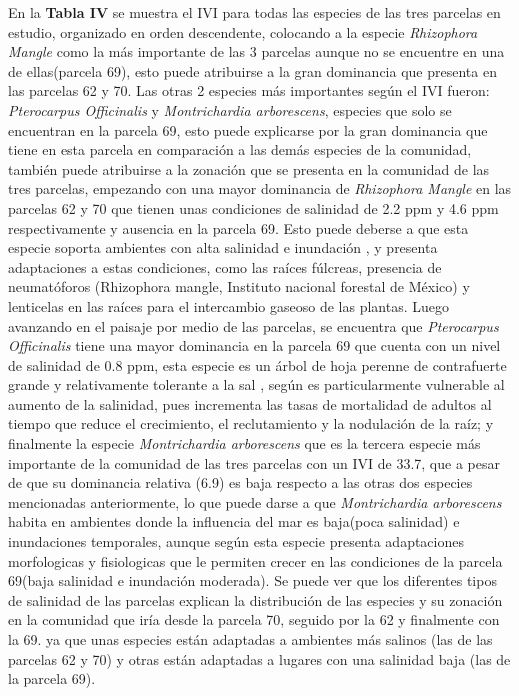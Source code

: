\documentclass[conference,final,12pt,]{IEEEtran}
\begin{document}
En la \textbf{Tabla IV} se muestra el IVI para todas las especies de las
tres parcelas en estudio, organizado en orden descendente, colocando a
la especie \emph{Rhizophora Mangle} como la más importante de las 3
parcelas aunque no se encuentre en una de ellas(parcela 69), esto puede
atribuirse a la gran dominancia que presenta en las parcelas 62 y 70.
Las otras 2 especies más importantes según el IVI fueron:
\emph{Pterocarpus Officinalis} y \emph{Montrichardia arborescens},
especies que solo se encuentran en la parcela 69, esto puede explicarse
por la gran dominancia que tiene en esta parcela en comparación a las
demás especies de la comunidad, también puede atribuirse a la zonación
que se presenta en la comunidad de las tres parcelas, empezando con una
mayor dominancia de \emph{Rhizophora Mangle} en las parcelas 62 y 70 que
tienen unas condiciones de salinidad de 2.2 ppm y 4.6 ppm
respectivamente y ausencia en la parcela 69. Esto puede deberse a que
esta especie soporta ambientes con alta salinidad e inundación
\citep{AF}, y presenta adaptaciones a estas condiciones, como las raíces
fúlcreas, presencia de neumatóforos (Rhizophora mangle, Instituto
nacional forestal de México) y lenticelas en las raíces para el
intercambio gaseoso de las plantas. Luego avanzando en el paisaje por
medio de las parcelas, se encuentra que \emph{Pterocarpus Officinalis}
tiene una mayor dominancia en la parcela 69 que cuenta con un nivel de
salinidad de 0.8 ppm, esta especie es un árbol de hoja perenne de
contrafuerte grande y relativamente tolerante a la sal \citep{AG}, según
\citep{AH}es particularmente vulnerable al aumento de la salinidad, pues
incrementa las tasas de mortalidad de adultos al tiempo que reduce el
crecimiento, el reclutamiento y la nodulación de la raíz; y finalmente
la especie \emph{Montrichardia arborescens} que es la tercera especie
más importante de la comunidad de las tres parcelas con un IVI de 33.7,
que a pesar de que su dominancia relativa (6.9) es baja respecto a las
otras dos especies mencionadas anteriormente, lo que puede darse a que
\emph{Montrichardia arborescens} habita en ambientes donde la influencia
del mar es baja(poca salinidad) e inundaciones temporales\citep{AI},
aunque según \citep{AI} esta especie presenta adaptaciones morfologicas y
fisiologicas que le permiten crecer en las condiciones de la parcela
69(baja salinidad e inundación moderada). Se puede ver que los
diferentes tipos de salinidad de las parcelas explican la distribución
de las especies y su zonación en la comunidad que iría desde la parcela
70, seguido por la 62 y finalmente con la 69. ya que unas especies están
adaptadas a ambientes más salinos (las de las parcelas 62 y 70) y otras
están adaptadas a lugares con una salinidad baja (las de la parcela 69).
\end{document}
